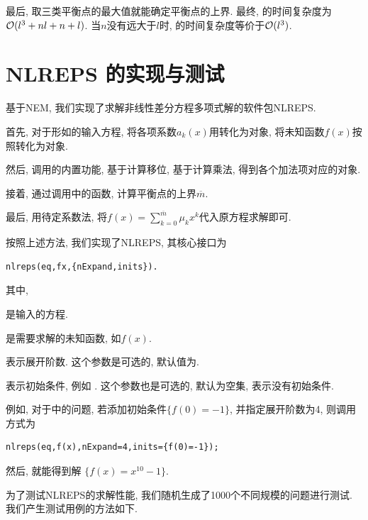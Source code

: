 最后, 取三类平衡点的最大值就能确定平衡点的上界. 最终, 的时间复杂度为$\mathcal O(l^3+nl+n+l)$. 当$n$没有远大于$l$时, 的时间复杂度等价于$\mathcal O(l^3)$.

\section{NLREPS 的实现与测试}\label{ch4sec4}

基于NEM, 我们实现了求解非线性差分方程多项式解的软件包NLREPS.
\begin{compactenum}[(1)]
\item 首先, 对于形如的输入方程, 将各项系数$a_k(x)$用转化为对象, 将未知函数$f(x)$按照转化为对象. 
\item 然后, 调用的内置功能, 基于计算移位, 基于计算乘法, 得到各个加法项对应的对象. 
\item 接着, 通过调用中的函数, 计算平衡点的上界$\overline{m}$.
\item 最后, 用待定系数法, 将$f(x)=\sum_{k=0}^{\overline{m}}{\mu_k x^k}$代入原方程求解即可. 
\end{compactenum}

按照上述方法, 我们实现了NLREPS, 其核心接口为
\begin{verbatim}
nlreps(eq,fx,{nExpand,inits}).
\end{verbatim}
其中,
\begin{compactitem}[\textbullet]
\item {} 是输入的方程.
\item {} 是需要求解的未知函数, 如$f(x)$.
\item {} 表示展开阶数. 这个参数是可选的, 默认值为. 
\item {} 表示初始条件, 例如 . 这个参数也是可选的, 默认为空集, 表示没有初始条件. 
\end{compactitem}

例如, 对于中的问题, 若添加初始条件$\{f(0)=-1\}$, 并指定展开阶数为4, 则调用方式为
\begin{verbatim}
nlreps(eq,f(x),nExpand=4,inits={f(0)=-1});
\end{verbatim}
然后, 就能得到解 $\{f(x)=x^{10}-1\}$.

为了测试NLREPS的求解性能, 我们随机生成了1000个不同规模的问题进行测试. 我们产生测试用例的方法如下.

